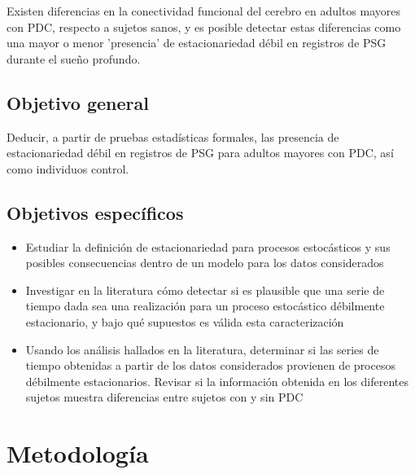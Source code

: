 Existen diferencias en la conectividad funcional del cerebro en adultos mayores con PDC, respecto
a sujetos sanos, y es posible detectar estas diferencias como una mayor o menor 'presencia' de 
estacionariedad débil en registros de PSG durante el sueño profundo.


\subsection{Objetivo general}

Deducir, a partir de pruebas estadísticas formales, las presencia de estacionariedad débil en
registros de PSG para adultos mayores con PDC, así como individuos control.


\subsection{Objetivos específicos}

\begin{itemize}
\item Estudiar la definición de estacionariedad para procesos estocásticos y sus posibles 
consecuencias dentro de un modelo para los datos considerados

\item Investigar en la literatura cómo detectar si es plausible que una serie de tiempo dada sea 
una realización para un proceso estocástico débilmente estacionario, y bajo qué supuestos 
es válida esta caracterización

\item Usando los análisis hallados en la literatura, determinar si las series de tiempo 
obtenidas a partir de los datos considerados provienen de procesos débilmente estacionarios.
Revisar si la información obtenida en los diferentes sujetos muestra diferencias entre sujetos 
con y sin PDC
\end{itemize}

\section{Metodología}

